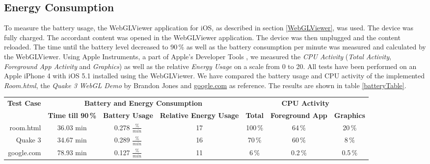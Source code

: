 \documentclass[12pt,journal,compsoc]{IEEEtran}
\begin{document}
\subsection{Energy Consumption}
To measure the battery usage, the WebGLViewer application for iOS, as described in section \ref{WebGLViewer}, was used. The device was fully charged. The accordant content was opened in the WebGLViewer application. The device was then unplugged and the content reloaded. The time until the battery level decreased to 90\,\% as well as the battery consumption per minute was measured and calculated by the WebGLViewer. Using Apple Instruments, a part of Apple’s Developer Tools \cite{AppleDevTools}, we measured the \textit{CPU Activity} (\textit{Total Activity}, \textit{Foreground App Activity} and \textit{Graphics}) as well as the relative \textit{Energy Usage} on a scale from 0 to 20. All tests have been performed on an Apple iPhone 4 with iOS 5.1 installed using the WebGLViewer. We have compared the battery usage and CPU activity of the implemented \textit{Room.html}, the \textit{Quake 3 WebGL Demo} by Brandon Jones \cite{quakewebgl} and \url{google.com} as reference. The results are shown in table \ref{batteryTable}.

\begin{table*}[tb]
	\begin{centering}
	\begin{tabular}{r|c|c|c|c|c|c}
		\multirow{2}{*}{\textbf{Test Case}} & \multicolumn{3}{c|}{\textbf{Battery and Energy Consumption}}						 & \multicolumn{3}{c}{\textbf{CPU Activity}}					\\
 							&\textbf{Time till 90\,\%} & \textbf{Battery Usage}	& \textbf{Relative Energy Usage} & \textbf{Total} 	& \textbf{Foreground App} 		& \textbf{Graphics}	\\
		\hline
		room.html		   &	36.03 min				& 0.278 $\frac{\%}{min}$	&	17							& 100\,\%			& 64\,\%						& 20\,\%			\\
		Quake 3			   &	34.67 min				& 0.289 $\frac{\%}{min}$	&	16							& 70\,\%			& 60\,\%						& 8\,\%			\\
		google.com		   &	78.93 min				& 0.127	$\frac{\%}{min}$	&	11							& 6\,\%				& 0.2\,\%						& 0.5\,\%		\\
	\end{tabular}
	\caption{Battery consumption and CPU activity of different WebGL applications\label{batteryTable}}
	\end{centering}
\end{table*}
\end{document}
